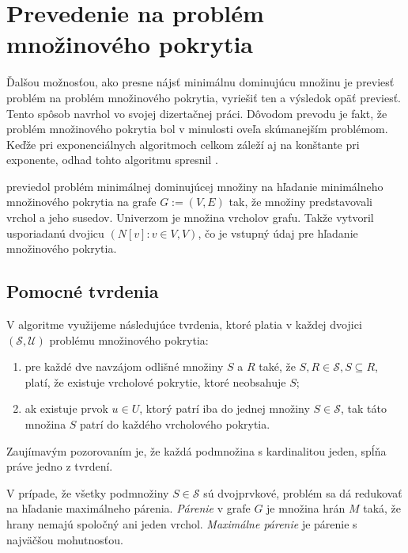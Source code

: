 
\section{Prevedenie na problém množinového pokrytia}

Ďalšou možnosťou, ako presne nájsť minimálnu dominujúcu množinu je previesť 
problém na problém množinového pokrytia, vyriešiť ten a výsledok opäť previesť.
Tento spôsob navrhol \citet{grandoni04} vo svojej dizertačnej práci. Dôvodom 
prevodu je fakt, že problém množinového pokrytia bol v minulosti oveľa 
skúmanejším problémom.
Keďže pri exponenciálnych algoritmoch celkom záleží aj na konštante pri 
exponente, odhad tohto algoritmu spresnil \citet{fomin05}. 

\citet{grandoni04} previedol problém minimálnej dominujúcej množiny na 
hľadanie minimálneho množinového pokrytia na grafe $G := (V, E)$ tak, že 
množiny predstavovali vrchol a jeho susedov. Univerzom je množina vrcholov 
grafu. Takže vytvoril usporiadanú dvojicu $({N[v] : v \in V }, V)$, čo je 
vstupný údaj pre hľadanie množinového pokrytia.

\subsection{Pomocné tvrdenia}

V algoritme využijeme následujúce tvrdenia, ktoré platia v každej dvojici 
$(\mathcal{S}, \mathcal{U})$ problému množinového pokrytia:
\begin{enumerate}
	\item pre každé dve navzájom odlišné množiny $S$ a $R$ také, že 
		$S, R \in \mathcal{S}, S \subseteq R$, platí, že existuje vrcholové 
		pokrytie, ktoré neobsahuje $S$;
	\item ak existuje prvok $u \in U$, ktorý patrí iba do jednej množiny 
		$S \in \mathcal{S}$, tak táto množina $S$ patrí do každého vrcholového 
		pokrytia.
\end{enumerate}

Zaujímavým pozorovaním je, že každá podmnožina s kardinalitou jeden, spĺňa 
práve jedno z tvrdení.

V prípade, že všetky podmnožiny $S \in \mathcal{S}$ sú dvojprvkové, problém 
sa dá redukovať na hľadanie maximálneho párenia. \emph{Párenie} v grafe $G$ 
je množina hrán $M$ taká, že hrany nemajú spoločný ani jeden vrchol. 
\emph{Maximálne párenie} je párenie s najväčšou mohutnosťou.


